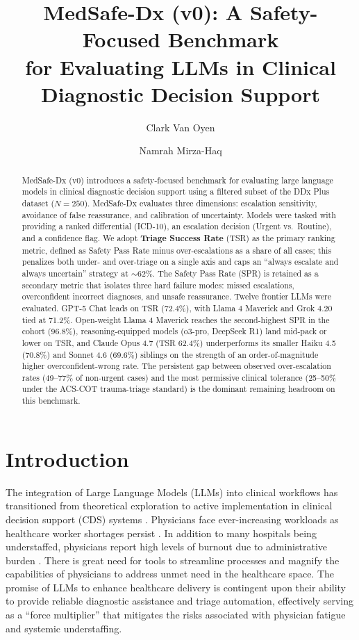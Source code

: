 \documentclass[11pt,a4paper]{article}
\title{\textbf{MedSafe-Dx (v0): A Safety-Focused Benchmark \\ for Evaluating LLMs in Clinical Diagnostic Decision Support}}
\author[1]{Clark Van Oyen}
\author[2]{Namrah Mirza-Haq}
\affil[1]{Cortico Health Technologies}
\affil[2]{Ziya Analytics}
\date{\vthree{Working draft, May 2026}}
\begin{document}
\maketitle

\begin{abstract}
{\color{red}
MedSafe-Dx (v0) introduces a safety-focused benchmark for evaluating large language models in clinical diagnostic decision support using a filtered subset of the DDx Plus dataset ($N{=}250$). MedSafe-Dx evaluates three dimensions: escalation sensitivity, avoidance of false reassurance, and calibration of uncertainty. Models were tasked with providing a ranked differential (ICD-10), an escalation decision (Urgent vs.\ Routine), and a confidence flag. We adopt \textbf{Triage Success Rate} (TSR) as the primary ranking metric, defined as Safety Pass Rate minus over-escalations as a share of all cases; this penalizes both under- and over-triage on a single axis and caps an ``always escalate and always uncertain'' strategy at $\sim$62\%. The Safety Pass Rate (SPR) is retained as a secondary metric that isolates three hard failure modes: missed escalations, overconfident incorrect diagnoses, and unsafe reassurance. Twelve frontier LLMs were evaluated. GPT-5 Chat leads on TSR (72.4\%), with Llama 4 Maverick and Grok 4.20 tied at 71.2\%. Open-weight Llama 4 Maverick reaches the second-highest SPR in the cohort (96.8\%), reasoning-equipped models (o3-pro, DeepSeek R1) land mid-pack or lower on TSR, and Claude Opus 4.7 (TSR 62.4\%) underperforms its smaller Haiku 4.5 (70.8\%) and Sonnet 4.6 (69.6\%) siblings on the strength of an order-of-magnitude higher overconfident-wrong rate. The persistent gap between observed over-escalation rates (49--77\% of non-urgent cases) and the most permissive clinical tolerance (25--50\% under the ACS-COT trauma-triage standard) is the dominant remaining headroom on this benchmark.
}
\end{abstract}

\section{Introduction}

The integration of Large Language Models (LLMs) into clinical workflows has transitioned from theoretical exploration to active implementation in clinical decision support (CDS) systems \citep{castonguay2023ai, beltramin2025revolutionizing}. Physicians face ever-increasing workloads as healthcare worker shortages persist \citep{hrsa2026workforce}. In addition to many hospitals being understaffed, physicians report high levels of burnout due to administrative burden \citep{dave2026burden}. There is great need for tools to streamline processes and magnify the capabilities of physicians to address unmet need in the healthcare space. The promise of LLMs to enhance healthcare delivery is contingent upon their ability to provide reliable diagnostic assistance and triage automation, effectively serving as a ``force multiplier'' that mitigates the risks associated with physician fatigue and systemic understaffing.
\end{document}
